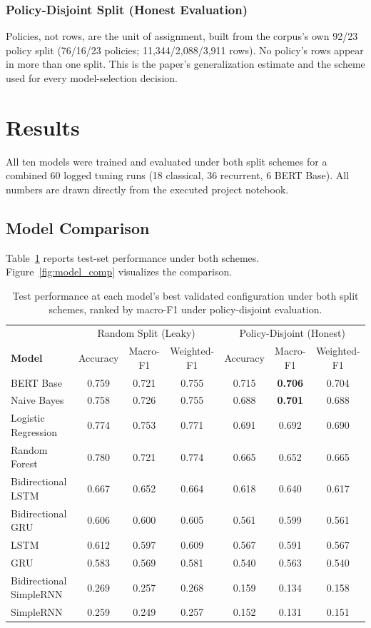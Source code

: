\documentclass[11pt]{article}
\begin{document}
\subsubsection{Policy-Disjoint Split (Honest Evaluation)}

Policies, not rows, are the unit of assignment, built from the corpus's own 92/23 policy split (76/16/23 policies; 11,344/2,088/3,911 rows). No policy's rows appear in more than one split. This is the paper's generalization estimate and the scheme used for every model-selection decision.

\section{Results}

All ten models were trained and evaluated under both split schemes for a combined 60 logged tuning runs (18 classical, 36 recurrent, 6 BERT Base). All numbers are drawn directly from the executed project notebook.

\subsection{Model Comparison}

Table~\ref{tab:results} reports test-set performance under both schemes. Figure~\ref{fig:model_comp} visualizes the comparison.

\begin{table}[t]
\centering
\small
\setlength{\tabcolsep}{3.5pt}
\begin{tabular}{@{}lccc@{\hspace{1em}}ccc@{}}
\toprule
 & \multicolumn{3}{c}{Random Split (Leaky)} & \multicolumn{3}{c}{Policy-Disjoint (Honest)} \\
\textbf{Model} & Accuracy & Macro-F1 & Weighted-F1 & Accuracy & Macro-F1 & Weighted-F1 \\
\midrule
BERT Base & 0.759 & 0.721 & 0.755 & 0.715 & \textbf{0.706} & 0.704 \\
Naive Bayes & 0.758 & 0.726 & 0.755 & 0.688 & \textbf{0.701} & 0.688 \\
Logistic Regression & 0.774 & 0.753 & 0.771 & 0.691 & 0.692 & 0.690 \\
Random Forest & 0.780 & 0.721 & 0.774 & 0.665 & 0.652 & 0.665 \\
Bidirectional LSTM & 0.667 & 0.652 & 0.664 & 0.618 & 0.640 & 0.617 \\
Bidirectional GRU & 0.606 & 0.600 & 0.605 & 0.561 & 0.599 & 0.561 \\
LSTM & 0.612 & 0.597 & 0.609 & 0.567 & 0.591 & 0.567 \\
GRU & 0.583 & 0.569 & 0.581 & 0.540 & 0.563 & 0.540 \\
Bidirectional SimpleRNN & 0.269 & 0.257 & 0.268 & 0.159 & 0.134 & 0.158 \\
SimpleRNN & 0.259 & 0.249 & 0.257 & 0.152 & 0.131 & 0.151 \\
\bottomrule
\end{tabular}
\caption{Test performance at each model's best validated configuration under both split schemes, ranked by macro-F1 under policy-disjoint evaluation.}
\label{tab:results}
\end{table}
\end{document}
